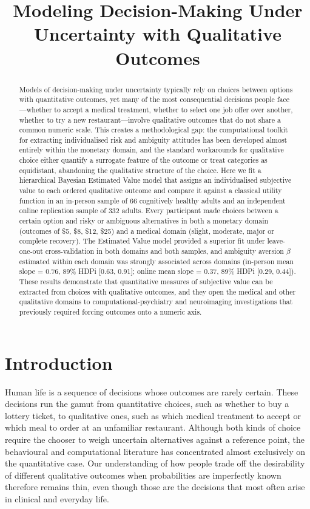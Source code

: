 \documentclass[11pt]{article}
\title{Modeling Decision-Making Under Uncertainty with Qualitative Outcomes}
\author{}
\date{}
\begin{document}
\maketitle

\begin{abstract}
Models of decision-making under uncertainty typically rely on choices between options with quantitative outcomes, yet many of the most consequential decisions people face---whether to accept a medical treatment, whether to select one job offer over another, whether to try a new restaurant---involve qualitative outcomes that do not share a common numeric scale. This creates a methodological gap: the computational toolkit for extracting individualised risk and ambiguity attitudes has been developed almost entirely within the monetary domain, and the standard workarounds for qualitative choice either quantify a surrogate feature of the outcome or treat categories as equidistant, abandoning the qualitative structure of the choice. Here we fit a hierarchical Bayesian Estimated Value model that assigns an individualised subjective value to each ordered qualitative outcome and compare it against a classical utility function in an in-person sample of 66 cognitively healthy adults and an independent online replication sample of 332 adults. Every participant made choices between a certain option and risky or ambiguous alternatives in both a monetary domain (outcomes of \$5, \$8, \$12, \$25) and a medical domain (slight, moderate, major or complete recovery). The Estimated Value model provided a superior fit under leave-one-out cross-validation in both domains and both samples, and ambiguity aversion $\beta$ estimated within each domain was strongly associated across domains (in-person mean slope = 0.76, 89\% HDPi [0.63, 0.91]; online mean slope = 0.37, 89\% HDPi [0.29, 0.44]). These results demonstrate that quantitative measures of subjective value can be extracted from choices with qualitative outcomes, and they open the medical and other qualitative domains to computational-psychiatry and neuroimaging investigations that previously required forcing outcomes onto a numeric axis.
\end{abstract}

\section{Introduction}

Human life is a sequence of decisions whose outcomes are rarely certain. These decisions run the gamut from quantitative choices, such as whether to buy a lottery ticket, to qualitative ones, such as which medical treatment to accept or which meal to order at an unfamiliar restaurant. Although both kinds of choice require the chooser to weigh uncertain alternatives against a reference point, the behavioural and computational literature has concentrated almost exclusively on the quantitative case. Our understanding of how people trade off the desirability of different qualitative outcomes when probabilities are imperfectly known therefore remains thin, even though those are the decisions that most often arise in clinical and everyday life.
\end{document}
